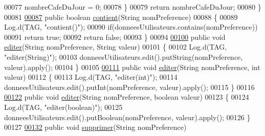 \begin{DoxyCode}
00077             nombreCafeDuJour = 0;
00078         \}
00079         \textcolor{keywordflow}{return} nombreCafeDuJour;
00080     \}
00081 
\hyperlink{classcom_1_1example_1_1ekawa_1_1_preference_a25b7a4cfcc9fe5f9258471ce454a718a}{00087}     \textcolor{keyword}{public} \textcolor{keywordtype}{boolean} \hyperlink{classcom_1_1example_1_1ekawa_1_1_preference_a25b7a4cfcc9fe5f9258471ce454a718a}{contient}(String nomPreference)
00088     \{
00089         Log.d(TAG, \textcolor{stringliteral}{"contient()"});
00090         \textcolor{keywordflow}{if}(donneesUtilisateurs.contains(nomPreference))
00091             \textcolor{keywordflow}{return} \textcolor{keyword}{true};
00092         \textcolor{keywordflow}{return} \textcolor{keyword}{false};
00093     \}
00094 
\hyperlink{classcom_1_1example_1_1ekawa_1_1_preference_a5af7a0595acfd41f1bd0b34ca0bfcb2a}{00100}     \textcolor{keyword}{public} \textcolor{keywordtype}{void} \hyperlink{classcom_1_1example_1_1ekawa_1_1_preference_a5af7a0595acfd41f1bd0b34ca0bfcb2a}{editer}(String nomPreference, String valeur)
00101     \{
00102         Log.d(TAG, \textcolor{stringliteral}{"editer(String)"});
00103         donneesUtilisateurs.edit().putString(nomPreference, valeur).apply();
00104     \}
00105 
\hyperlink{classcom_1_1example_1_1ekawa_1_1_preference_a7c14e4d338ffca5c03fda6b16289d8ce}{00111}     \textcolor{keyword}{public} \textcolor{keywordtype}{void} \hyperlink{classcom_1_1example_1_1ekawa_1_1_preference_a7c14e4d338ffca5c03fda6b16289d8ce}{editer}(String nomPreference, \textcolor{keywordtype}{int} valeur)
00112     \{
00113         Log.d(TAG, \textcolor{stringliteral}{"editer(int)"});
00114         donneesUtilisateurs.edit().putInt(nomPreference, valeur).apply();
00115     \}
00116 
\hyperlink{classcom_1_1example_1_1ekawa_1_1_preference_a701dc293c4474f59028733e94b49b9da}{00122}     \textcolor{keyword}{public} \textcolor{keywordtype}{void} \hyperlink{classcom_1_1example_1_1ekawa_1_1_preference_a701dc293c4474f59028733e94b49b9da}{editer}(String nomPreference, \textcolor{keywordtype}{boolean} valeur)
00123     \{
00124         Log.d(TAG, \textcolor{stringliteral}{"editer(boolean)"});
00125         donneesUtilisateurs.edit().putBoolean(nomPreference, valeur).apply();
00126     \}
00127 
\hyperlink{classcom_1_1example_1_1ekawa_1_1_preference_a63914421a8e7b8f79822853e3aff3106}{00132}     \textcolor{keyword}{public} \textcolor{keywordtype}{void} \hyperlink{classcom_1_1example_1_1ekawa_1_1_preference_a63914421a8e7b8f79822853e3aff3106}{supprimer}(String nomPreference)

\end{DoxyCode}
